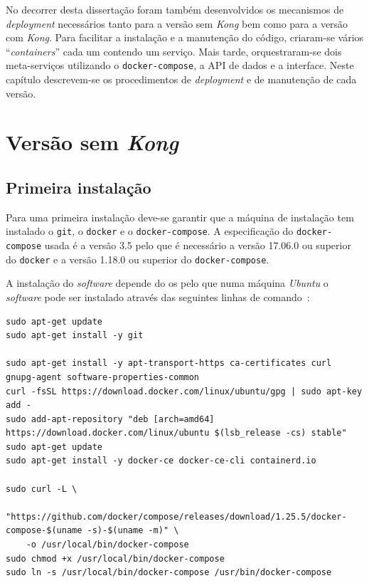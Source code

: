 No decorrer desta dissertação foram também desenvolvidos os mecanismos de \textit{deployment} necessários tanto para a versão sem \textit{Kong} bem como para a versão com \textit{Kong}. Para  facilitar  a  instalação  e  a  manutenção  do  código,  criaram-se  vários ``\textit{containers}'' cada um contendo um serviço. Mais tarde, orquestraram-se dois meta-serviços utilizando o \texttt{docker-compose}, a API de dados e a interface. Neste capítulo descrevem-se os procedimentos de \textit{deployment} e de manutenção de cada versão.

\section{Versão sem \textit{Kong}}\label{sec:deployNoKong}

\subsection{Primeira instalação}\label{sec:inst-prim}

Para uma primeira instalação deve-se garantir que a máquina de instalação tem instalado o \texttt{git}, o \texttt{docker} e o \texttt{docker-compose}. A especificação do \texttt{docker-compose} usada é a versão 3.5 pelo que é necessário a versão 17.06.0 ou superior do \texttt{docker} e a versão 1.18.0 ou superior do \texttt{docker-compose}. 

A instalação do \textit{software} depende do \acrshort{os} pelo que numa máquina \textit{Ubuntu} o \textit{software} pode ser instalado através das seguintes linhas de comando~\cite{installDocker,installDC}:
\begin{lstlisting}[caption=Instalar \textit{docker} e \textit{docker-compose}]
sudo apt-get update
sudo apt-get install -y git

sudo apt-get install -y apt-transport-https ca-certificates curl gnupg-agent software-properties-common
curl -fsSL https://download.docker.com/linux/ubuntu/gpg | sudo apt-key add -
sudo add-apt-repository "deb [arch=amd64] https://download.docker.com/linux/ubuntu $(lsb_release -cs) stable"
sudo apt-get update
sudo apt-get install -y docker-ce docker-ce-cli containerd.io

sudo curl -L \
    "https://github.com/docker/compose/releases/download/1.25.5/docker-compose-$(uname -s)-$(uname -m)" \
    -o /usr/local/bin/docker-compose
sudo chmod +x /usr/local/bin/docker-compose
sudo ln -s /usr/local/bin/docker-compose /usr/bin/docker-compose
\end{lstlisting}

